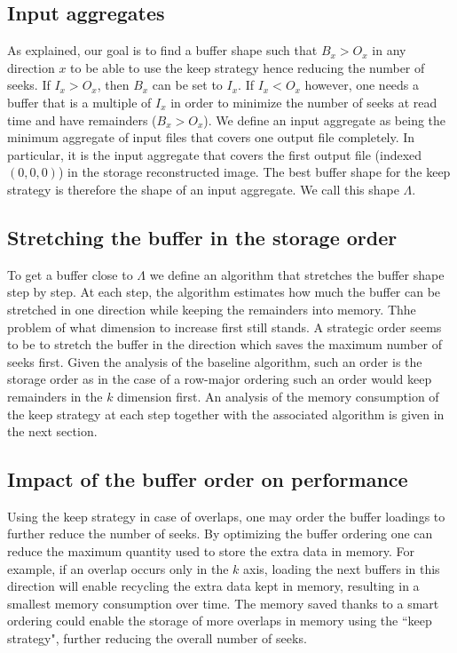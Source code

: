 \documentclass[conference]{IEEEtran}
\begin{document}
\subsection{Input aggregates}
As explained, our goal is to find a buffer shape such that $B_x>O_x$ in any
direction $x$ to be able to use the keep strategy hence reducing the number of
seeks. If $I_x > O_x$, then $B_x$ can be set to $I_x$. If $I_x < O_x$ however,
one needs a buffer that is a multiple of $I_x$ in order to minimize the number
of seeks at read time and have remainders ($B_x>O_x$). We define an input
aggregate as being the minimum aggregate of input files that covers one output
file completely. In particular, it is the input aggregate that covers the first
output file (indexed $(0,0,0)$) in the storage reconstructed image. The best
buffer shape for the keep strategy is therefore the shape of an input aggregate.
We call this shape $\Lambda$.

\subsection{Stretching the buffer in the storage order}
To get a buffer close to $\Lambda$ we define an algorithm that stretches the
buffer shape step by step. At each step, the algorithm estimates how much the
buffer can be stretched in one direction while keeping the remainders into
memory. Thhe problem of what dimension to increase first still stands. A
strategic order seems to be to stretch the buffer in the direction which saves
the maximum number of seeks first. Given the analysis of the baseline algorithm,
such an order is the storage order as in the case of a row-major ordering such
an order would keep remainders in the $k$ dimension first. An analysis of the
memory consumption of the keep strategy at each step together with the associated
algorithm is given in the next section.

\subsection{Impact of the buffer order on performance}
Using the keep strategy in case of overlaps, one may order the buffer loadings
to further reduce the number of seeks. By optimizing the buffer ordering one can
reduce the maximum quantity used to store the extra data in memory. For example,
if an overlap occurs only in the $k$ axis, loading the next buffers in this
direction will enable recycling the extra data kept in memory, resulting in a
smallest memory consumption over time. The memory saved thanks to a smart
ordering could enable the storage of more overlaps in memory using the
``keep strategy", further reducing the overall number of seeks.
\end{document}
